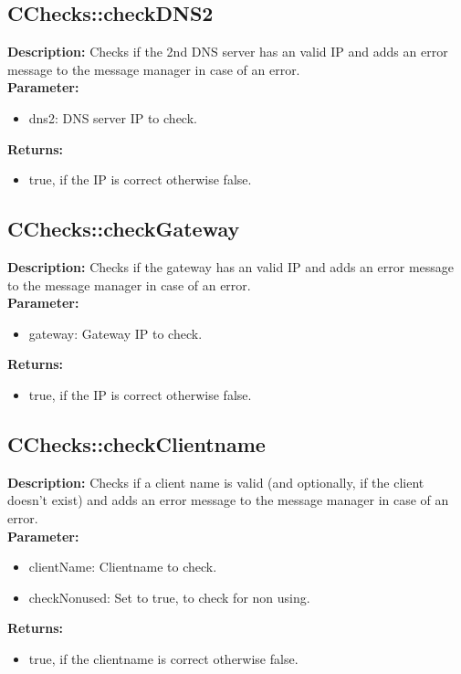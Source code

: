 \subsection{CChecks::checkDNS2}
\textbf{Description:} Checks if the 2nd DNS server has an valid IP and adds an error message to the message manager in case of an error.\\
\textbf{Parameter:}
\begin{itemize}
\item dns2: DNS server IP to check.
\end{itemize}
\textbf{Returns:}
\begin{itemize}
\item true, if the IP is correct otherwise false.
\end{itemize}

\subsection{CChecks::checkGateway}
\textbf{Description:} Checks if the gateway has an valid IP and adds an error message to the message manager in case of an error.\\
\textbf{Parameter:}
\begin{itemize}
\item gateway: Gateway IP to check.
\end{itemize}
\textbf{Returns:}
\begin{itemize}
\item true, if the IP is correct otherwise false.
\end{itemize}

\subsection{CChecks::checkClientname}
\textbf{Description:} Checks if a client name is valid (and optionally, if the client doesn't exist) and adds an error message to the message manager in case of an error.\\
\textbf{Parameter:}
\begin{itemize}
\item clientName: Clientname to check.
\item checkNonused: Set to true, to check for non using.
\end{itemize}
\textbf{Returns:}
\begin{itemize}
\item true, if the clientname is correct otherwise false.
\end{itemize}

